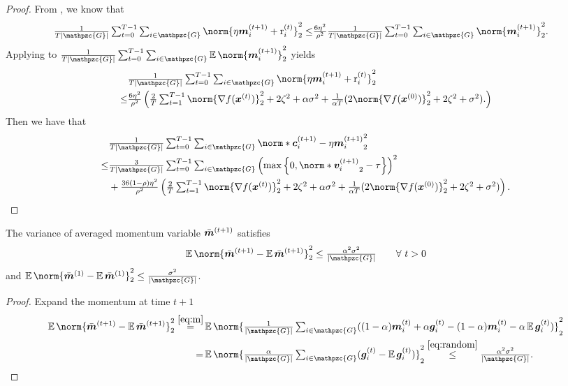 \documentclass{article}
\newcommand{\gset}{\ensuremath{{\mathpzc{G}}}}
\begin{document}
\begin{proof}
  From , we know that
  \begin{align*}
    \tfrac{1}{T|\gset|} \tsum_{t=0}^{T-1} \tsum_{i\in\gset} \norm{\eta\mm_i^{(t+1)} +\rr_i^{(t)} }_2^2
    \le & \tfrac{6\eta^2}{\rho^2} \tfrac{1}{T|\gset|}  \tsum_{t=0}^{T-1} \tsum_{i\in\gset}\norm{\mm_i^{(t+1)} }_2^2.
  \end{align*}
  Applying  to $\tfrac{1}{T|\gset|}\tsum_{t=0}^{T-1} \tsum_{i\in\gset}
    \E\norm{\mm_i^{(t+1)}}_2^2$ yields
  \begin{align*}
        & \tfrac{1}{T|\gset|} \tsum_{t=0}^{T-1} \tsum_{i\in\gset} \norm{\eta\mm_i^{(t+1)} +\rr_i^{(t)} }_2^2 \\
    \le & \tfrac{6\eta^2}{\rho^2} \left(\tfrac{2}{T}\tsum_{t=1}^{T-1} \norm{\nabla f(\xx^{(t)}) }_2^2
    +  2  \zeta^2
    + \alpha\sigma^2
    + \tfrac{1}{\alpha T}(2\norm{\nabla f(\xx^{(0)}) }_2^2
      + 2 \zeta^2
      + \sigma^2). \right)
  \end{align*}
  Then we have that
  \begin{align*}
        & \tfrac{1}{T|\gset|}\tsum_{t=0}^{T-1}\tsum_{i\in\gset}\norm*{ \cc_i^{(t+1)}  - \eta \mm_i^{(t+1)}  }_2^2            \\
    \le &
    \tfrac{3}{T|\gset|}\tsum_{t=0}^{T-1}\tsum_{i\in\gset}  \left(\max\left\{0, \norm*{\vv_i^{(t+1)}}_2-\tau\right\}\right)^2 \\
        & +
    \tfrac{36(1-\rho)\eta^2}{\rho^2} \left(\tfrac{2}{T}\tsum_{t=1}^{T-1} \norm{\nabla f(\xx^{(t)}) }_2^2
    +  2  \zeta^2
    + \alpha\sigma^2
    + \tfrac{1}{\alpha T}(2\norm{\nabla f(\xx^{(0)}) }_2^2
      + 2 \zeta^2
      + \sigma^2) \right).
  \end{align*}


\end{proof}
\begin{lemma}\label{lemma:m:var}
  The variance of averaged momentum variable $\bar{\bm{m}}^{(t+1)}$ satisfies
  \begin{equation}
    \E\norm{\bar{\mm}^{(t+1)} - \E\bar{\mm}^{(t+1)} }_2^2 \leq \tfrac{\alpha^2\sigma^2}{|\gset|} \qquad \forall~t>0
  \end{equation}
  and $\E\norm{\bar{\mm}^{(1)} - \E\bar{\mm}^{(1)} }_2^2 \leq \tfrac{\sigma^2}{|\gset|}$.
\end{lemma}
\begin{proof}
  Expand the momentum at time $t+1$
  \begin{align*}
    \E\norm{\bar{\mm}^{(t+1)} - \E\bar{\mm}^{(t+1)} }_2^2
    \stackrel{\eqref{eq:m}}{=} & \E\norm{\tfrac{1}{|\gset|}\tsum_{i\in\gset} ((1-\alpha)\mm_i^{(t)} + \alpha \gg_i^{(t)} - (1-\alpha)\mm_i^{(t)} - \alpha \E\gg_i^{(t)}) }_2^2 \\
    =                          & \E\norm{\tfrac{\alpha}{|\gset|}\tsum_{i\in\gset} (\gg_i^{(t)} - \E\gg_i^{(t)} ) }_2^2
    \stackrel{\eqref{eq:random}}{\leq} \tfrac{\alpha^2\sigma^2}{|\gset|}.
  \end{align*}
\end{proof}
\end{document}
